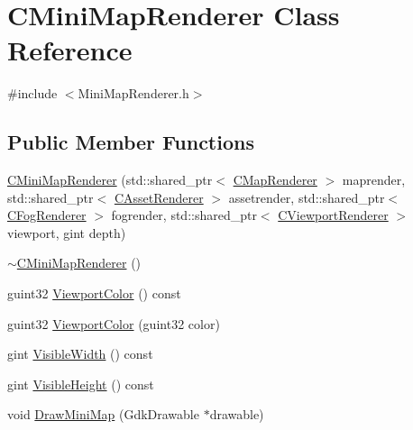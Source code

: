 \hypertarget{classCMiniMapRenderer}{}\section{C\+Mini\+Map\+Renderer Class Reference}
\label{classCMiniMapRenderer}


{\ttfamily \#include $<$Mini\+Map\+Renderer.\+h$>$}

\subsection*{Public Member Functions}
\begin{DoxyCompactItemize}
\item 
\hyperlink{classCMiniMapRenderer_a6ed3c6e7e2352ac9278493eb71ddc60c}{C\+Mini\+Map\+Renderer} (std\+::shared\+\_\+ptr$<$ \hyperlink{classCMapRenderer}{C\+Map\+Renderer} $>$ maprender, std\+::shared\+\_\+ptr$<$ \hyperlink{classCAssetRenderer}{C\+Asset\+Renderer} $>$ assetrender, std\+::shared\+\_\+ptr$<$ \hyperlink{classCFogRenderer}{C\+Fog\+Renderer} $>$ fogrender, std\+::shared\+\_\+ptr$<$ \hyperlink{classCViewportRenderer}{C\+Viewport\+Renderer} $>$ viewport, gint depth)
\item 
\hyperlink{classCMiniMapRenderer_a1ae803589192f1d0845e28cdbef19b5a}{$\sim$\+C\+Mini\+Map\+Renderer} ()
\item 
guint32 \hyperlink{classCMiniMapRenderer_a465a10988fd1b47ee1ef223055e1ae65}{Viewport\+Color} () const
\item 
guint32 \hyperlink{classCMiniMapRenderer_a89bf3db7ca4273dfcadff53da12824fc}{Viewport\+Color} (guint32 color)
\item 
gint \hyperlink{classCMiniMapRenderer_ac81d364e25f10efe5fdcd71aee03e60d}{Visible\+Width} () const
\item 
gint \hyperlink{classCMiniMapRenderer_a2681c028e9f9ad916881a06846cd7110}{Visible\+Height} () const
\item 
void \hyperlink{classCMiniMapRenderer_aa7f3db866eeea3f92725f2b25ceee23c}{Draw\+Mini\+Map} (Gdk\+Drawable $\ast$drawable)
\end{DoxyCompactItemize}
